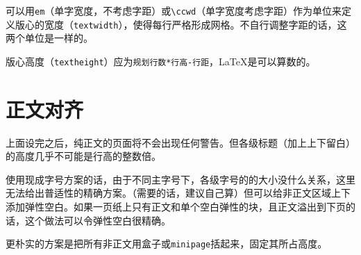 \documentclass[10pt,openany]{book}
\begin{document}
可以用\texttt{em}（单字宽度，不考虑字距）或\texttt{\textbackslash{}ccwd}（单字宽度考虑字距）作为单位来定义版心的宽度（\texttt{textwidth}），使得每行严格形成网格。不自行调整字距的话，这两个单位是一样的。

版心高度（\texttt{textheight}）应为\texttt{规划行数*行高-行距}，{\LaTeX}是可以算数的。



\section{正文对齐}

上面设完之后，纯正文的页面将不会出现任何警告。但各级标题（加上上下留白）的高度几乎不可能是行高的整数倍。

使用现成字号方案的话，由于不同主字号下，各级字号的的大小没什么关系，这里无法给出普适性的精确方案。（需要的话，建议自己算）但可以给非正文区域上下添加弹性空白。如果一页纸上只有正文和单个空白弹性的块，且正文溢出到下页的话，这个做法可以令弹性空白很精确。



更朴实的方案是把所有非正文用盒子或\texttt{minipage}括起来，固定其所占高度。



\stopcontents[tutorial]

\listoftables
\listoffigures
\lstlistoflistings
\end{document}

